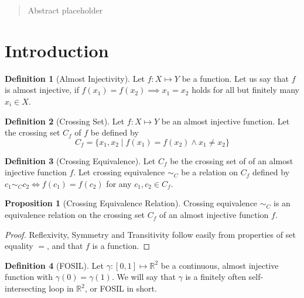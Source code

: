 \documentclass{article}
\theoremstyle{definition}
\newtheorem{definition}{Definition}
\theoremstyle{proposition}
\newtheorem{proposition}{Proposition}
\theoremstyle{theorem}
\begin{document}
\maketitle

\begin{abstract}
Abstract placeholder
\end{abstract}

\section{Introduction}
\begin{definition}[Almost Injectivity]
Let $f: X \mapsto Y$ be a function. Let us say that $f$ is almost injective, if $f(x_{1})=f(x_{2}) \implies x_{1} = x_{2}$ holds for all but finitely many $x_{i}\in X$.
\end{definition}

\begin{definition}[Crossing Set]
Let $f: X \mapsto Y$ be an almost injective function. Let the crossing set $C_{f}$ of $f$ be defined by $$C_{f} = \{x_{1}, x_{2} \mid f(x_{1}) = f(x_{2}) \land x_{1} \neq x_{2}\}$$
\end{definition}

\begin{definition}[Crossing Equivalence]
Let $C_{f}$ be the crossing set of of an almost injective function $f$. Let crossing equivalence $\sim_{C}$ be a relation on $C_{f}$ defined by $c_{1} \sim_{C} c_{2} \iff f(c_{1})=f(c_{2})$ for any $c_{1}, c_{2} \in C_{f}$.
\end{definition}

\begin{proposition}[Crossing Equivalence Relation]
Crossing equivalence $\sim_{C}$ is an equivalence relation on the crossing set $C_{f}$ of an almost injective function $f$.
\end{proposition}

\begin{proof}
Reflexivity, Symmetry and Transitivity follow easily from properties of set equality $=$, and that $f$ is a function.
\end{proof}

\begin{definition}[FOSIL]
Let $\gamma : [0, 1] \mapsto \mathbb{R}^{2}$ be a continuous, almost injective function with $\gamma(0) = \gamma(1)$. We will say that $\gamma$ is a finitely often self-intersecting loop in $\mathbb{R}^{2}$, or FOSIL in short.
\end{definition}
\end{document}
